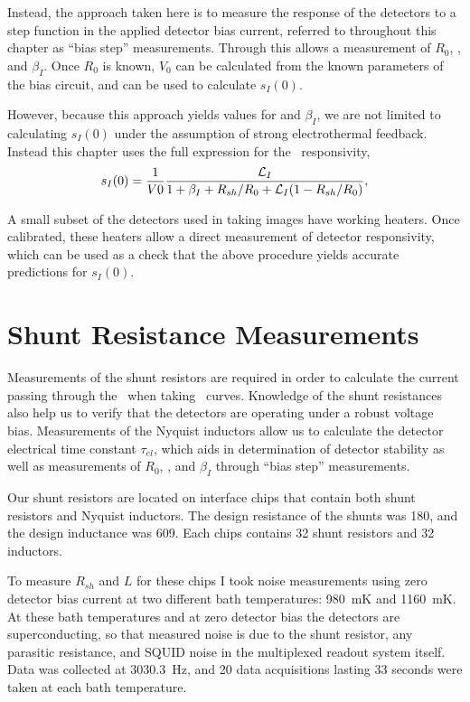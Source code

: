 Instead, the approach taken here is to measure the response of the detectors to a step function in the applied detector bias current, referred to throughout this chapter as ``bias step'' measurements.
Through  this allows a measurement of $R_0$, \Loop, and $\beta_I$.
Once $R_0$ is known, $V_0$ can be calculated from the known parameters of the bias circuit, and  can be used to calculate $s_I(0)$.

However, because this approach yields values for \Loop and $\beta_I$, we are not limited to calculating $s_I(0)$ under the assumption of strong electrothermal feedback.
Instead this chapter uses the full expression for the \DC\ responsivity,
\begin{equation} \label{eqn:ch6-dc-resp-full}
  s_I(0) =  \frac{1}{V0}\frac{\mathcal{L}_I}{1 + \beta_I + R_{sh}/R_0 + \mathcal{L}_I(1 - R_{sh} / R_0)},
\end{equation}

A small subset of the detectors used in taking images have working heaters.
Once calibrated, these heaters allow a direct measurement of detector responsivity, which can be used as a check that the above procedure yields accurate predictions for $s_I(0)$.

\section{Shunt Resistance Measurements}\label{sec:shunt-nyquist}

%
%

Measurements of the shunt resistors are required in order to calculate the current passing through the \TES\ when taking \IV\ curves.
Knowledge of the shunt resistances also help us to verify that the detectors are operating under a robust voltage bias.
Measurements of the Nyquist inductors allow us to calculate the detector electrical time constant $\tau_{el}$, which aids in determination of detector stability as well as measurements of $R_0$, \Loop, and $\beta_I$ through ``bias step'' measurements.

Our shunt resistors are located on interface chips that contain both shunt resistors and Nyquist inductors.
The design resistance of the shunts was \SI{180}{\uOhm}, and the design inductance was \SI{609}{\nH}.
Each chips contains 32 shunt resistors and 32 inductors.

To measure $R_{sh}$ and $L$ for these chips I took noise measurements using zero detector bias current at two different bath temperatures: 980~mK and 1160~mK.
At these bath temperatures and at zero detector bias the detectors are superconducting, so that measured noise is due to the shunt resistor, any parasitic resistance, and SQUID noise in the multiplexed readout system itself.
Data was collected at 3030.3~Hz, and 20 data acquisitions lasting 33 seconds were taken at each bath temperature.

